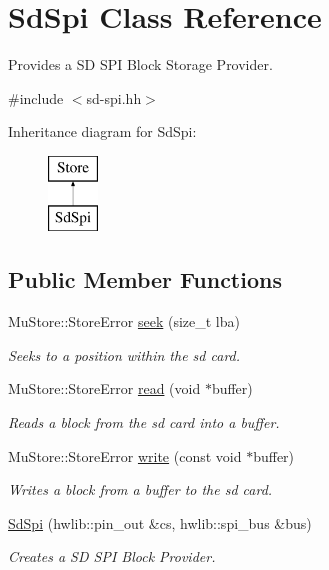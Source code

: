 \hypertarget{class_sd_spi}{}\section{Sd\+Spi Class Reference}
\label{class_sd_spi}


Provides a SD S\+PI Block Storage Provider.  




{\ttfamily \#include $<$sd-\/spi.\+hh$>$}

Inheritance diagram for Sd\+Spi\+:\begin{figure}[H]
\begin{center}
\leavevmode
\includegraphics[height=2.000000cm]{class_sd_spi}
\end{center}
\end{figure}
\subsection*{Public Member Functions}
\begin{DoxyCompactItemize}
\item 
Mu\+Store\+::\+Store\+Error \hyperlink{class_sd_spi_a4120c7d7ccaeba5b2726f0fca6a97e9c}{seek} (size\+\_\+t lba)
\begin{DoxyCompactList}\small\item\em Seeks to a position within the sd card. \end{DoxyCompactList}\item 
Mu\+Store\+::\+Store\+Error \hyperlink{class_sd_spi_a90ee59c74ce983406c769b76c0083aa4}{read} (void $\ast$buffer)
\begin{DoxyCompactList}\small\item\em Reads a block from the sd card into a buffer. \end{DoxyCompactList}\item 
Mu\+Store\+::\+Store\+Error \hyperlink{class_sd_spi_ab3b314f23176ef7ed1197fb73d34f86f}{write} (const void $\ast$buffer)
\begin{DoxyCompactList}\small\item\em Writes a block from a buffer to the sd card. \end{DoxyCompactList}\item 
\hyperlink{class_sd_spi_a5a813ec0573cab136e4248787a46541a}{Sd\+Spi} (hwlib\+::pin\+\_\+out \&cs, hwlib\+::spi\+\_\+bus \&bus)
\begin{DoxyCompactList}\small\item\em Creates a SD S\+PI Block Provider. \end{DoxyCompactList}\end{DoxyCompactItemize}
